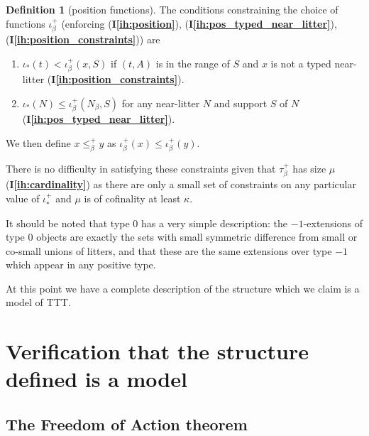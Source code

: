 \documentclass[112pt]{article}
\theoremstyle{definition}
\newtheorem{definition}[theorem]{Definition}
\theoremstyle{remark}
\newcommand{\ihref}[1]{(\textbf{I\ref{#1}})}
\begin{document}
\begin{definition}[position functions]

The conditions constraining the choice of functions $\iota^+_\beta$ 
 ({enforcing }\ihref{ih:position}, \ihref{ih:pos_typed_near_litter}, \ihref{ih:position_constraints}) are

\begin{enumerate}

\item $\iota_*(t) < \iota^+_\beta(x,S)$ if $(t,A)$ is in the range of $S$ and $x$ is not a typed near-litter {\ihref{ih:position_constraints}}.

\item $\iota_*(N) \leq \iota^+_\beta(N_\beta,S)$ for any near-litter $N$ and support $S$ of $N$ 
  \ihref{ih:pos_typed_near_litter}. 

\end{enumerate}

We then define $x \leq^+_\beta y$ as $\iota^+_\beta(x) \leq \iota^+_\beta(y)$.
\end{definition}

There is no difficulty in satisfying these constraints {given that $\tau_\beta^+$ has size $\mu$ \ihref{ih:cardinality}} as there are only a small set of constraints on any particular value of $\iota_*^+$ and $\mu$ is of cofinality at least $\kappa$.




   It should be noted that type 0 has a very simple description:  the $-1$-extensions of type 0 objects are exactly the sets with small symmetric difference from small or co-small unions of litters, and that these are the same extensions over type $-1$ which appear in any positive type.


At this point we have a complete description of the structure which we claim is a model of TTT.



\newpage

\section{Verification that the structure defined is a model}\label{s:verification}

\subsection{The Freedom of Action theorem}\label{ss:foa}
\end{document}
